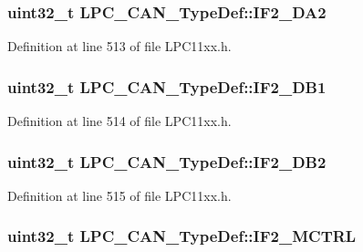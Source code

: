 \subsubsection[{\texorpdfstring{I\+F2\+\_\+\+D\+A2}{IF2_DA2}}]{ uint32\+\_\+t L\+P\+C\+\_\+\+C\+A\+N\+\_\+\+Type\+Def\+::\+I\+F2\+\_\+\+D\+A2}\hypertarget{group___l_p_c11xx___definitions_ga148142dc7364af3052e4d6f9eb40994c}{}\label{group___l_p_c11xx___definitions_ga148142dc7364af3052e4d6f9eb40994c}


Definition at line 513 of file L\+P\+C11xx.\+h.

\subsubsection[{\texorpdfstring{I\+F2\+\_\+\+D\+B1}{IF2_DB1}}]{ uint32\+\_\+t L\+P\+C\+\_\+\+C\+A\+N\+\_\+\+Type\+Def\+::\+I\+F2\+\_\+\+D\+B1}\hypertarget{group___l_p_c11xx___definitions_gac012bbcf7bb1c4652d6bafed70b18597}{}\label{group___l_p_c11xx___definitions_gac012bbcf7bb1c4652d6bafed70b18597}


Definition at line 514 of file L\+P\+C11xx.\+h.

\subsubsection[{\texorpdfstring{I\+F2\+\_\+\+D\+B2}{IF2_DB2}}]{ uint32\+\_\+t L\+P\+C\+\_\+\+C\+A\+N\+\_\+\+Type\+Def\+::\+I\+F2\+\_\+\+D\+B2}\hypertarget{group___l_p_c11xx___definitions_gaf9b91f8118a022094558ac2d0b7ece77}{}\label{group___l_p_c11xx___definitions_gaf9b91f8118a022094558ac2d0b7ece77}


Definition at line 515 of file L\+P\+C11xx.\+h.

\subsubsection[{\texorpdfstring{I\+F2\+\_\+\+M\+C\+T\+RL}{IF2_MCTRL}}]{ uint32\+\_\+t L\+P\+C\+\_\+\+C\+A\+N\+\_\+\+Type\+Def\+::\+I\+F2\+\_\+\+M\+C\+T\+RL}\hypertarget{group___l_p_c11xx___definitions_ga0aefb018eeb2b0ee1f41e09f41fee754}{}\label{group___l_p_c11xx___definitions_ga0aefb018eeb2b0ee1f41e09f41fee754}


